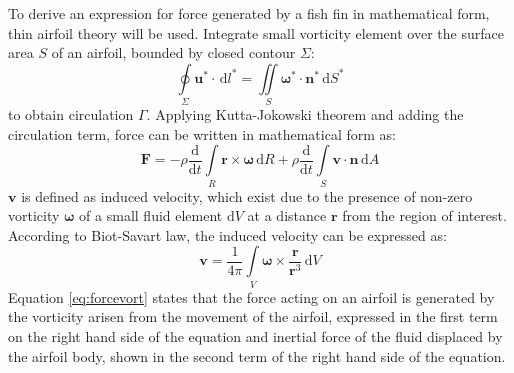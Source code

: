 To derive an expression for force generated by a fish fin in mathematical form, thin airfoil theory will be used. Integrate small vorticity element over the surface area $S$ of an airfoil, bounded by closed contour $\Sigma$:
\begin{equation}
    \oint\limits_{\Sigma} \mathbf{u}^{*} \cdot\, \mathrm{d}l^{*} = \iint\limits_{S} \boldsymbol{\omega}^{*} \cdot \mathbf{n}^{*}\, \mathrm{d}S^{*}
    \label{eq:vortintegrate}
\end{equation}
to obtain circulation $\Gamma$. Applying Kutta-Jokowski theorem and adding the circulation term, force can be written in mathematical form as:
\begin{equation}
    \mathbf{F} = -\rho\frac{\mathrm{d}}{\mathrm{d}t} \int\limits_{R} \mathbf{r} \times \boldsymbol{\omega}\, \mathrm{d}R+ \rho\frac{\mathrm{d}}{\mathrm{d}t} \int\limits_{S} \mathbf{v} \cdot \mathbf{n}\, \mathrm{d}A
    \label{eq:forcevort}
\end{equation}
$\mathbf{v}$ is defined as induced velocity, which exist due to the presence of non-zero vorticity $\boldsymbol{\omega}$ of a small fluid element $\mathrm{d}V$ at a distance $\mathbf{r}$ from the region of interest. According to Biot-Savart law, the induced velocity can be expressed as:
\begin{equation}
    \mathbf{v} = \frac{1}{4\pi} \int\limits_{V} \boldsymbol{\omega} \times \frac{\mathbf{r}}{\mathbf{r}^{3}}\, \mathrm{d}V
    \label{eq:biotsavartvelo}
\end{equation}
Equation \ref{eq:forcevort} states that the force acting on an airfoil is generated by the vorticity arisen from the movement of the airfoil, expressed in the first term on the right hand side of the equation and inertial force of the fluid displaced by the airfoil body, shown in the second term of the right hand side of the equation.
